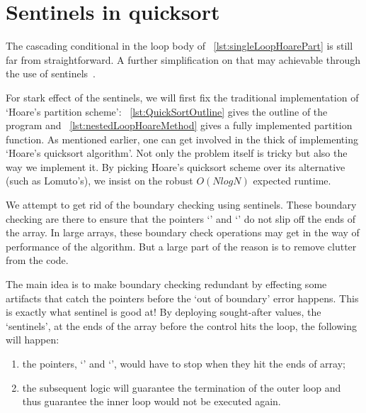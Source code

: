 
\section{Sentinels in quicksort}\label{sec:quick-sort-sentinel}

The cascading conditional in the loop body of ~\autoref{lst:singleLoopHoarePart}
is still far from straightforward.
A further simplification on that may achievable through the use of
sentinels~\cite{NumericalRecipes:1992}.



For stark effect of the sentinels, we will first fix the traditional implementation of `Hoare's
partition scheme':
~\autoref{lst:QuickSortOutline} gives the outline of the program and
~\autoref{lst:nestedLoopHoareMethod} gives a fully implemented partition function.
As mentioned earlier, one can get involved in the thick of implementing
`Hoare's quicksort algorithm'.
Not only the problem itself is tricky but also the way we implement it.
By picking Hoare's quicksort scheme over its alternative (such as Lomuto's),
we insist on the robust $O(N log N)$ expected runtime.


We attempt to get rid of the boundary checking using sentinels.
These boundary checking are there to ensure that the pointers `' and `' do not slip
off the ends of the array.
In large arrays, these boundary check operations may get in the way of performance of the algorithm.
But a large part of the reason is to remove clutter from the code.

The main idea is to make boundary checking redundant by effecting some artifacts that catch the
pointers before the `out of boundary' error happens.
This is exactly what sentinel is good at!
By deploying sought-after values, the `sentinels', at the ends of the array before the control
hits the loop, the following will happen:
\begin{enumerate}
    \item the pointers, `' and `', would have to stop when they hit the ends of
    array;
    \item the subsequent logic will guarantee the termination of the outer loop and
    thus guarantee the inner loop would not be executed again.
\end{enumerate}


